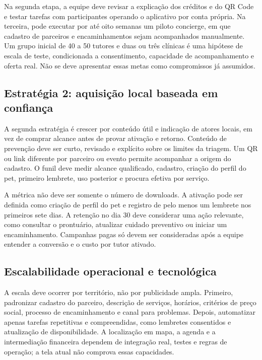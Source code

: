 \documentclass[12pt,a4paper]{article}
\begin{document}
Na segunda etapa, a equipe deve revisar a explicação dos créditos e do QR Code e testar tarefas com participantes operando o aplicativo por conta própria. Na terceira, pode executar por até oito semanas um piloto concierge, em que cadastro de parceiros e encaminhamentos sejam acompanhados manualmente. Um grupo inicial de 40 a 50 tutores e duas ou três clínicas é uma hipótese de escala de teste, condicionada a consentimento, capacidade de acompanhamento e oferta real. Não se deve apresentar essas metas como compromissos já assumidos.

\subsection{Estratégia 2: aquisição local baseada em confiança}

A segunda estratégia é crescer por conteúdo útil e indicação de atores locais, em vez de comprar alcance antes de provar ativação e retorno. Conteúdo de prevenção deve ser curto, revisado e explícito sobre os limites da triagem. Um QR ou link diferente por parceiro ou evento permite acompanhar a origem do cadastro. O funil deve medir alcance qualificado, cadastro, criação do perfil do pet, primeiro lembrete, uso posterior e procura efetiva por serviço.

A métrica não deve ser somente o número de downloads. A ativação pode ser definida como criação de perfil do pet e registro de pelo menos um lembrete nos primeiros sete dias. A retenção no dia 30 deve considerar uma ação relevante, como consultar o prontuário, atualizar cuidado preventivo ou iniciar um encaminhamento. Campanhas pagas só devem ser consideradas após a equipe entender a conversão e o custo por tutor ativado.

\subsection{Escalabilidade operacional e tecnológica}

A escala deve ocorrer por território, não por publicidade ampla. Primeiro, padronizar cadastro do parceiro, descrição de serviços, horários, critérios de preço social, processo de encaminhamento e canal para problemas. Depois, automatizar apenas tarefas repetitivas e compreendidas, como lembretes consentidos e atualização de disponibilidade. A localização em mapa, a agenda e a intermediação financeira dependem de integração real, testes e regras de operação; a tela atual não comprova essas capacidades.
\end{document}
